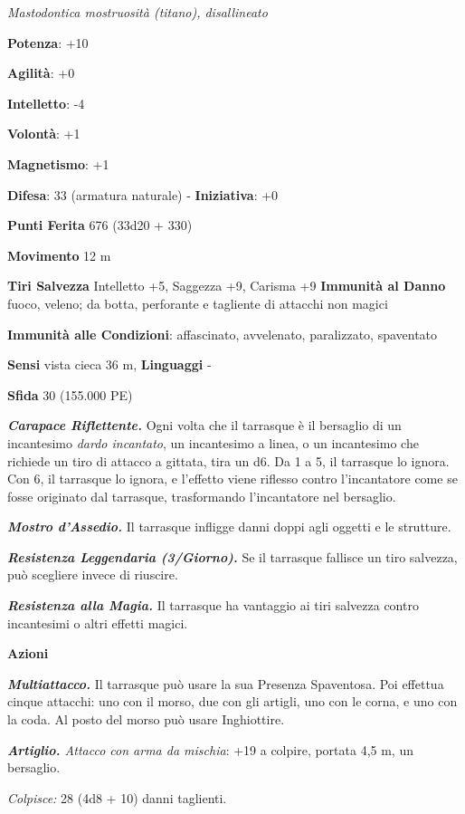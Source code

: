 \begin{multicols}{2}
\emph{Mastodontica mostruosità (titano), disallineato}

\textbf{Potenza}: +10

\textbf{Agilità}: +0

\textbf{Intelletto}: -4

\textbf{Volontà}: +1

\textbf{Magnetismo}: +1

\textbf{Difesa}: 33 (armatura naturale) - \textbf{Iniziativa}: +0

\textbf{Punti Ferita} 676 (33d20 + 330)

\textbf{Movimento} 12 m

\textbf{Tiri Salvezza} Intelletto +5, Saggezza +9, Carisma +9
\textbf{Immunità al Danno} fuoco, veleno; da botta, perforante e
tagliente di attacchi non magici

\textbf{Immunità alle Condizioni}: affascinato, avvelenato, paralizzato,
spaventato

\textbf{Sensi} vista cieca 36 m, 
\textbf{Linguaggi} -

\textbf{Sfida} 30 (155.000 PE)\smallskip

\emph{\textbf{Carapace Riflettente.}} Ogni volta che il tarrasque è il
bersaglio di un incantesimo \emph{dardo incantato}, un incantesimo a
linea, o un incantesimo che richiede un tiro di attacco a gittata, tira
un d6. Da 1 a 5, il tarrasque lo ignora. Con 6, il tarrasque lo ignora,
e l'effetto viene riflesso contro l'incantatore come se fosse originato
dal tarrasque, trasformando l'incantatore nel bersaglio.

\emph{\textbf{Mostro d'Assedio.}} Il tarrasque infligge danni doppi agli
oggetti e le strutture.

\emph{\textbf{Resistenza Leggendaria (3/Giorno).}} Se il tarrasque
fallisce un tiro salvezza, può scegliere invece di riuscire.

\emph{\textbf{Resistenza alla Magia.}} Il tarrasque ha vantaggio ai tiri
salvezza contro incantesimi o altri effetti magici.


\smallskip\textbf{Azioni}

\emph{\textbf{Multiattacco.}} Il tarrasque può usare la sua Presenza
Spaventosa. Poi effettua cinque attacchi: uno con il morso, due con gli
artigli, uno con le corna, e uno con la coda. Al posto del morso può
usare Inghiottire.

\emph{\textbf{Artiglio.} Attacco con arma da mischia}: +19 a colpire,
portata 4,5 m, un bersaglio.

\emph{Colpisce:} 28 (4d8 + 10) danni taglienti.


\end{multicols}
